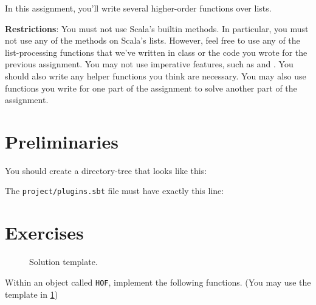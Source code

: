 
In this assignment, you'll write several higher-order functions over lists.

\textbf{Restrictions}: You must not use Scala's builtin methods. In particular, you must not
use any of the methods on Scala's lists. However, feel free to use any of the list-processing
functions that we've written in class or the code you wrote for the previous assignment.
You
may not use imperative features, such as  and .
You should also write any helper functions you think are necessary. You
may also use functions you write for one part of the assignment to solve
another part of the assignment.

\section{Preliminaries}

You should create a directory-tree that looks like this:


The \texttt{project/plugins.sbt} file must have exactly this line:


\section{Exercises}

\begin{figure}
\caption{Solution template.}
\label{hof_template}
\end{figure}

Within an object called \texttt{HOF}, implement the following functions.
(You may use the template in \cref{hof_template})

